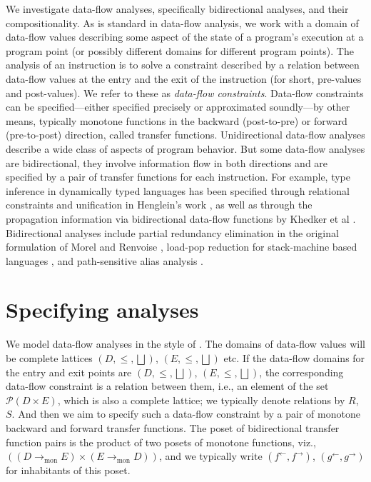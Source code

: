 \documentclass{easychair}
\theoremstyle{definition}
\newcommand{\Pow}{\mathcal{P}}
\newcommand{\tomon}{\to_{\mathrm{mon}}}
\newcommand{\ff}{{f^{\rightarrow}}}
\newcommand{\fb}{{f^{\leftarrow}}}
\newcommand{\gf}{{g^{\rightarrow}}}
\newcommand{\gb}{{g^{\leftarrow}}}
\newcommand{\bigjoin}{\bigsqcup}
\begin{document}
We investigate data-flow analyses, specifically bidirectional analyses, and their compositionality.
As is standard in data-flow analysis, we work with a domain of data-flow values describing some aspect of the state of a program's execution at a program point (or possibly different domains for different program points).
The analysis of an instruction is to solve a constraint described by a relation between data-flow values at the entry and the exit of the instruction (for short, pre-values and post-values). We refer to these as \emph{data-flow constraints}.
Data-flow constraints can be specified---either specified precisely or approximated soundly---by other means, typically monotone functions in the backward (post-to-pre) or forward (pre-to-post) direction, called transfer functions.
Unidirectional data-flow analyses describe a wide class of aspects of program behavior. But some data-flow analyses are bidirectional, they involve information flow in both directions and are specified by a pair of transfer functions for each instruction.
For example, type inference in dynamically typed languages has been specified through relational constraints and unification in Henglein's work \cite{henglein_dynamic_1992}, as well as through the propagation information via bidirectional data-flow functions by Khedker et al \cite{DBLP:journals/cl/KhedkerDM03,frade_bidirectional_2009}.
Bidirectional analyses include partial redundancy elimination in the original formulation of Morel and Renvoise \cite{DBLP:journals/cacm/MorelR79,khedker_bidirectional_1999}, load-pop reduction for stack-machine based languages \cite{stack,frade_bidirectional_2009}, and path-sensitive alias analysis \cite{jaiswal_bidirectionality_2020}.

\section{Specifying analyses}

We model data-flow analyses in the style of
\cite{frade_bidirectional_2009}.  The domains of data-flow values will
be complete lattices $(D, \leq, \bigjoin)$, $(E, \leq, \bigjoin)$ etc.
If the data-flow domains for the entry and exit points are $(D, \leq, \bigjoin)$,
$(E, \leq, \bigjoin)$, the corresponding data-flow constraint is a
relation between them, i.e., an element of the set
$\Pow(D \times E)$, which is also a complete lattice; we typically
denote relations by $R$, $S$.  And then we aim to specify such a
data-flow constraint by a pair of monotone backward and forward
transfer functions. The poset of bidirectional transfer function pairs
is the product of two posets of monotone functions, viz.,
$((D \tomon E) \times (E \tomon D))$, and we typically write
$(\fb, \ff)$, $(\gb , \gf)$ for inhabitants of this poset.
\end{document}
